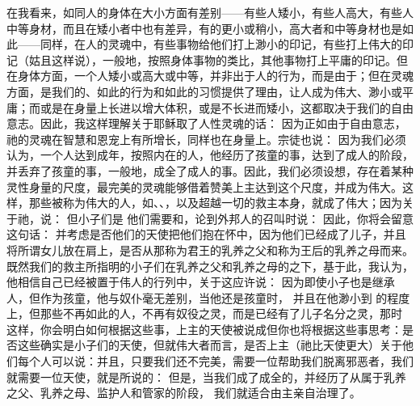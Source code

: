  在我看来，如同人的身体在大小方面有差别——有些人矮小，有些人高大，有些人中等身材，而且在矮小者中也有差异，有的更小或稍小，高大者和中等身材也是如此——同样，在人的灵魂中，有些事物给他们打上渺小的印记，有些打上伟大的印记（姑且这样说），一般地，按照身体事物的类比，其他事物打上平庸的印记。但在身体方面，一个人矮小或高大或中等，并非出于人的行为，而是由于；但在灵魂方面，是我们的、如此的行为和如此的习惯提供了理由，让人成为伟大、渺小或平庸；而或是在身量上长进以增大体积，或是不长进而矮小，这都取决于我们的自由意志。因此，我这样理解关于耶稣取了人性灵魂的话： 因为正如由于自由意志，祂的灵魂在智慧和恩宠上有所增长，同样也在身量上。宗徒也说： 因为我们必须认为，一个人达到成年，按照内在的人，他经历了孩童的事，达到了成人的阶段，并丢弃了孩童的事，一般地，成全了成人的事。因此，我们必须设想，存在着某种灵性身量的尺度，最完美的灵魂能够借着赞美上主达到这个尺度，并成为伟大。这样，那些被称为伟大的人，如、、，以及超越一切的救主本身，就成了伟大；因为关于祂，说： 但小子们是 他们需要和，论到外邦人的召叫时说： 因此，你将会留意这句话： 并考虑是否他们的天使把他们抱在怀中，因为他们已经成了儿子，并且将所谓女儿放在肩上，是否从那称为君王的乳养之父和称为王后的乳养之母而来。既然我们的救主所指明的小子们在乳养之父和乳养之母的之下，基于此，我认为，他相信自己已经被置于伟人的行列中，关于这应许说：  因为即使小子也是继承人，但作为孩童，他与奴仆毫无差别，当他还是孩童时， 并且在他渺小到 的程度上，但那些不再如此的人，不再有奴役之灵，而是已经有了儿子名分之灵，那时 这样，你会明白如何根据这些事，上主的天使被说成但你也将根据这些事思考：是否这些确实是小子们的天使，但就伟大者而言，是否上主（祂比天使更大）关于他们每个人可以说：并且，只要我们还不完美，需要一位帮助我们脱离邪恶者，我们就需要一位天使，就是所说的： 但是，当我们成了成全的，并经历了从属于乳养之父、乳养之母、监护人和管家的阶段， 我们就适合由主亲自治理了。\par

